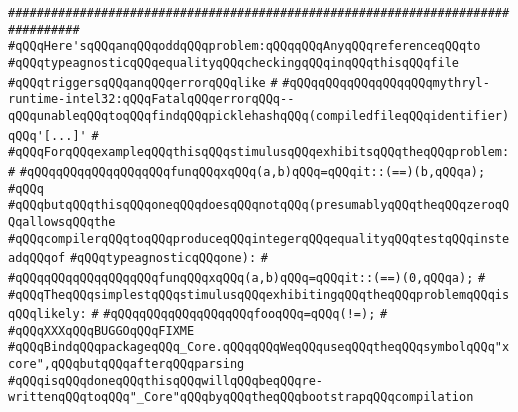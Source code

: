 \newline
\newline
\newline
\verb|################################################################################|\newline
\verb|#qQQqHere'sqQQqanqQQqoddqQQqproblem:qQQqqQQqAnyqQQqreferenceqQQqto|\newline
\verb|#qQQqtypeagnosticqQQqequalityqQQqcheckingqQQqinqQQqthisqQQqfile|\newline
\verb|#qQQqtriggersqQQqanqQQqerrorqQQqlike|\newline
\verb|#|\newline
\verb|#qQQqqQQqqQQqqQQqqQQqmythryl-runtime-intel32:qQQqFatalqQQqerrorqQQq--qQQqunableqQQqtoqQQqfindqQQqpicklehashqQQq(compiledfileqQQqidentifier)qQQq'[...]'|\newline
\verb|#|\newline
\verb|#qQQqForqQQqexampleqQQqthisqQQqstimulusqQQqexhibitsqQQqtheqQQqproblem:|\newline
\verb|#|\newline
\verb|#qQQqqQQqqQQqqQQqqQQqfunqQQqxqQQq(a,b)qQQq=qQQqit::(==)(b,qQQqa);|\newline
\verb|#qQQq|\newline
\verb|#qQQqbutqQQqthisqQQqoneqQQqdoesqQQqnotqQQq(presumablyqQQqtheqQQqzeroqQQqallowsqQQqthe|\newline
\verb|#qQQqcompilerqQQqtoqQQqproduceqQQqintegerqQQqequalityqQQqtestqQQqinsteadqQQqof|\newline
\verb|#qQQqtypeagnosticqQQqone):|\newline
\verb|#|\newline
\verb|#qQQqqQQqqQQqqQQqqQQqfunqQQqxqQQq(a,b)qQQq=qQQqit::(==)(0,qQQqa);|\newline
\verb|#|\newline
\verb|#qQQqTheqQQqsimplestqQQqstimulusqQQqexhibitingqQQqtheqQQqproblemqQQqisqQQqlikely:|\newline
\verb|#|\newline
\verb|#qQQqqQQqqQQqqQQqqQQqfooqQQq=qQQq(!=);|\newline
\verb|#|\newline
\verb|#qQQqXXXqQQqBUGGOqQQqFIXME|\newline
\newline
\verb|#qQQqBindqQQqpackageqQQq_Core.qQQqqQQqWeqQQquseqQQqtheqQQqsymbolqQQq"xcore",qQQqbutqQQqafterqQQqparsing|\newline
\verb|#qQQqisqQQqdoneqQQqthisqQQqwillqQQqbeqQQqre-writtenqQQqtoqQQq"_Core"qQQqbyqQQqtheqQQqbootstrapqQQqcompilation|\newline

